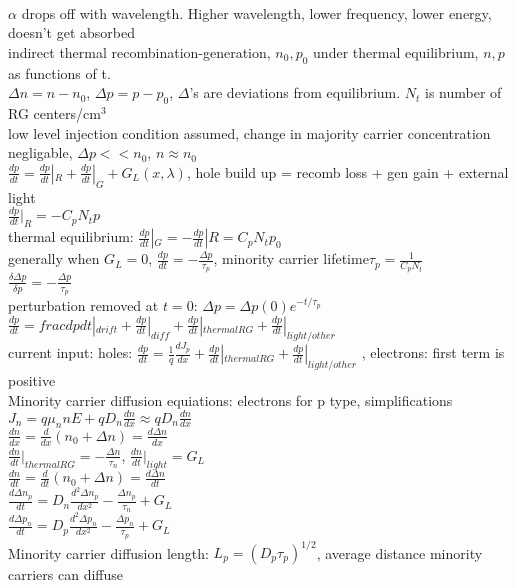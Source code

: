 \documentclass{article}
\begin{document}
\\$\alpha$ drops off with wavelength. Higher wavelength, lower frequency, lower energy, doesn't get absorbed
\\indirect thermal recombination-generation, $n_0, p_0$ under thermal equilibrium, $n, p$ as functions of t.
\\$\Delta n=n-n_0$, $\Delta p=p-p_0$, $\Delta$'s are deviations from equilibrium. $N_t$ is number of RG centers/cm$^3$
\\low level injection condition assumed, change in majority carrier concentration negligable, $\Delta p<<n_0$, $n\approx n_0$
\\$\frac{dp}{dt}=\frac{dp}{dt}|_R+\frac{dp}{dt}|_G+G_L(x,\lambda)$, hole build up = recomb loss + gen gain + external light
\\$\frac{dp}{dt}|_R=-C_pN_tp$
\\thermal equilibrium: $\frac{dp}{dt}|_G=-\frac{dp}{dt}|R=C_pN_tp_0$
\\generally when $G_L=0$, $\frac{dp}{dt}=-\frac{\Delta p}{\tau_p}$, minority carrier lifetime$\tau_p=\frac{1}{C_pN_t}$
\\$\frac{\delta\Delta p}{\delta p}=-\frac{\Delta p}{\tau_p}$
\\perturbation removed at $t=0$: $\Delta p=\Delta p(0)e^{-t/\tau_p}$
\\$\frac{dp}{dt}=frac{dp}{dt}|_{drift}+\frac{dp}{dt}|_{diff}+\frac{dp}{dt}|_{thermal RG}+\frac{dp}{dt}|_{light/other}$
\\current input: holes: $\frac{dp}{dt}=\frac{1}{q}\frac{d J_p}{dx}+\frac{dp}{dt}|_{thermal RG}+\frac{dp}{dt}|_{light/other}$ , electrons: first term is positive
\\Minority carrier diffusion equiations:  electrons for p type, simplifications
\\$J_n=q\mu_nnE+qD_n\frac{dn}{dx}\approx qD_n\frac{dn}{dx}$
\\$\frac{dn}{dx}=\frac{d}{dx}(n_0+\Delta n)=\frac{d\Delta n}{dx}$
\\$\frac{dn}{dt}|_{thermal RG} = -\frac{\Delta n}{\tau_n}$,   $\frac{dn}{dt}|_{light}=G_L$
\\$\frac{dn}{dt}=\frac{d}{dt}(n_0+\Delta n)=\frac{d\Delta n}{dt}$
\\$\frac{d\Delta n_p}{dt}=D_n\frac{d^2\Delta n_p}{dx^2}-\frac{\Delta n_p}{\tau_n}+G_L$
\\$\frac{d\Delta p_n}{dt}=D_p\frac{d^2\Delta p_n}{dx^2}-\frac{\Delta p_n}{\tau_p}+G_L$
\\Minority carrier diffusion length: $L_p=(D_p\tau_p)^{1/2}$, average distance minority carriers can diffuse
\end{document}
